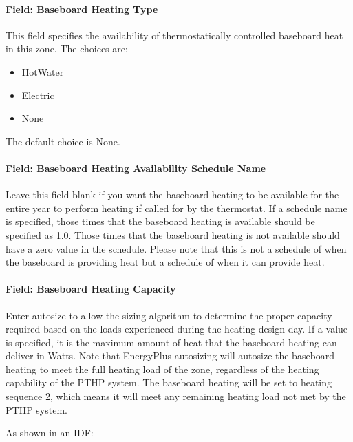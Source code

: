 \paragraph{Field: Baseboard Heating Type}\label{field-baseboard-heating-type-3}

This field specifies the availability of thermostatically controlled baseboard heat in this zone. The choices are:

\begin{itemize}
\item
  HotWater
\item
  Electric
\item
  None
\end{itemize}

The default choice is None.

\paragraph{Field: Baseboard Heating Availability Schedule Name}\label{field-baseboard-heating-availability-schedule-name-3}

Leave this field blank if you want the baseboard heating to be available for the entire year to perform heating if called for by the thermostat. If a schedule name is specified, those times that the baseboard heating is available should be specified as 1.0. Those times that the baseboard heating is not available should have a zero value in the schedule. Please note that this is not a schedule of when the baseboard is providing heat but a schedule of when it can provide heat.

\paragraph{Field: Baseboard Heating Capacity}\label{field-baseboard-heating-capacity-3}

Enter autosize to allow the sizing algorithm to determine the proper capacity required based on the loads experienced during the heating design day. If a value is specified, it is the maximum amount of heat that the baseboard heating can deliver in Watts. Note that EnergyPlus autosizing will autosize the baseboard heating to meet the full heating load of the zone, regardless of the heating capability of the PTHP system. The baseboard heating will be set to heating sequence 2, which means it will meet any remaining heating load not met by the PTHP system.

As shown in an IDF:

